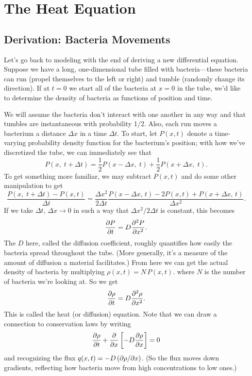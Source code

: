\documentclass[../m180main.tex]{subfiles}
\begin{document}
\chapter{The Heat Equation}
\section{Derivation: Bacteria Movements}
Let's go back to modeling with the end of deriving a new differential equation.
Suppose we have a long, one-dimensional tube filled with bacteria---these bacteria can run (propel themselves to the left or right) and tumble (randomly change its direction).
If at $t=0$ we start all of the bacteria at $x=0$ in the tube, we'd like to determine the density of bacteria as functions of position and time.

We will assume the bacteria don't interact with one another in any way and that tumbles are instantaneous with probability 1/2.
Also, each run moves a bacterium a distance $\Delta x$ in a time $\Delta t$.
To start, let $P(x,t)$ denote a time-varying probability density function for the bacterium's position; with how we've discretized the tube, we can immediately see that
\[ P(x, \; t + \Delta t) = \frac{1}{2} P(x - \Delta x, \;t) + \frac{1}{2}P(x + \Delta x, \; t). \]
To get something more familiar, we may subtract $P(x,t)$ and do some other manipulation to get
\[ \frac{P(x, \; t + \Delta t) - P(x,t)}{\Delta t} = \frac{\Delta x^2}{2 \Delta t} \frac{P(x - \Delta x, \, t) - 2 P(x,t) + P(x + \Delta x, \, t)}{\Delta x^2}. \]
If we take $\Delta t, \, \Delta x \to 0$ in such a way that $\Delta x^2 / 2 \Delta t$ is constant, this becomes
\[ \frac{\partial P}{\partial t} = D \frac{\partial^2 P}{\partial x^2}. \]
The $D$ here, called the diffusion coefficient, roughly quantifies how easily the bacteria spread throughout the tube.
(More generally, it's a measure of the amount of diffusion a material facilitates.)
From here we can get the actual density of bacteria by multiplying $\rho(x,t) = N \, P(x,t)$. where $N$ is the number of bacteria we're looking at.
So we get
\[ \frac{\partial \rho}{\partial t} = D \frac{\partial^2 \rho}{\partial x^2}. \]
This is called the heat (or diffusion) equation.
Note that we can draw a connection to conservation laws by writing
\[ \frac{\partial \rho}{\partial t} + \frac{\partial}{\partial x} \left[ -D \frac{\partial \rho}{\partial x} \right] = 0 \]
and recognizing the flux $q(x,t) = - D \,(\partial \rho / \partial x)$.
(So the flux moves down gradients, reflecting how bacteria move from high concentrations to low ones.)
\end{document}
